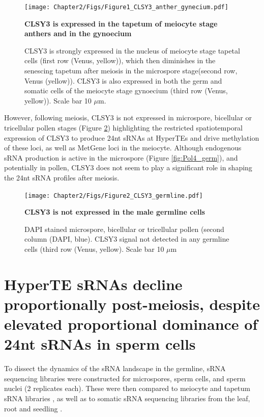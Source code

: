 \begin{figure}[htbp!] 
\centering    
    \texttt{[image: Chapter2/Figs/Figure1\_CLSY3\_anther\_gynecium.pdf]}
\caption{\textbf{CLSY3 is expressed in the tapetum of meiocyte stage anthers and in the gynoecium}}
\label{fig:CLSY3_anther}
\captionsetup{font=small}
    \caption*{CLSY3 is strongly expressed in the nucleus of meiocyte stage tapetal cells (first row (Venus, yellow)), which then diminishes in the senescing tapetum after meiosis in the microspore stage(second row, Venus (yellow)). CLSY3 is also expressed in both the germ and somatic cells of the meiocyte stage gynoecium (third row (Venus, yellow)). Scale bar 10 $\mu$m.}
\end{figure}

However, following meiosis, CLSY3 is not expressed in microspore, bicellular or tricellular pollen stages (Figure \ref{fig:CLSY3_germ}) highlighting the restricted spatiotemporal expression of CLSY3 to produce 24nt sRNAs at HyperTEs and drive methylation of these loci, as well as MetGene loci in the meiocyte. Although endogenous sRNA production is active in the microspore (Figure \ref{fig:Pol4_germ}), and potentially in pollen, CLSY3 does not seem to play a significant role in shaping the 24nt sRNA profiles after meiosis.

\begin{figure}[htbp!] 
\centering    
    \texttt{[image: Chapter2/Figs/Figure2\_CLSY3\_germline.pdf]}
\caption{\textbf{CLSY3 is not expressed in the male germline cells}}
\label{fig:CLSY3_germ}
\captionsetup{font=small}
    \caption*{DAPI stained microspore, bicellular or tricellular pollen (second column (DAPI, blue). CLSY3 signal not detected in any germline cells (third row (Venus, yellow). Scale bar 10 $\mu$m}
\end{figure}


\section{HyperTE sRNAs decline proportionally post-meiosis, despite elevated proportional dominance of 24nt sRNAs in sperm cells}

To dissect the dynamics of the sRNA landscape in the germline, sRNA sequencing libraries were constructed for microspores, sperm cells, and sperm nuclei (2 replicates each). These were then compared to meiocyte and tapetum sRNA libraries \cite{RN187}, as well as to somatic sRNA sequencing libraries from the leaf, root and seedling \cite{RN262,RN263,RN264}. 

